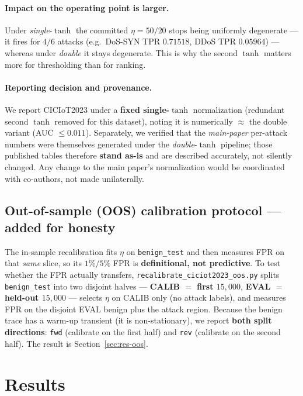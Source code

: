 \documentclass[11pt]{article}
\begin{document}
\paragraph{Impact on the operating point is larger.} Under \emph{single}-$\tanh$ the committed
$\eta=50/20$ stops being uniformly degenerate --- it fires for $4/6$ attacks (e.g.\ DoS-SYN
TPR $0.71518$, DDoS TPR $0.05964$) --- whereas under \emph{double} it stays degenerate. This is why
the second $\tanh$ matters more for thresholding than for ranking.

\paragraph{Reporting decision and provenance.} We report CICIoT2023 under a \textbf{fixed
single-$\tanh$} normalization (redundant second $\tanh$ removed for this dataset), noting it is
numerically $\approx$ the double variant (AUC $\le 0.011$). Separately, we verified that the
\emph{main-paper} per-attack numbers were themselves generated under the \emph{double}-$\tanh$
pipeline; those published tables therefore \textbf{stand as-is} and are described accurately, not
silently changed. Any change to the main paper's normalization would be coordinated with co-authors,
not made unilaterally.

\subsection{Out-of-sample (OOS) calibration protocol --- added for honesty}
\label{sec:oos}

The in-sample recalibration fits $\eta$ on \texttt{benign\_test} and then measures FPR on that
\emph{same} slice, so its $1\%/5\%$ FPR is \textbf{definitional, not predictive}. To test whether the
FPR actually transfers, \texttt{recalibrate\_ciciot2023\_oos.py} splits \texttt{benign\_test} into two
disjoint halves --- \textbf{CALIB $=$ first $15{,}000$}, \textbf{EVAL $=$ held-out $15{,}000$} ---
selects $\eta$ on CALIB only (no attack labels), and measures FPR on the disjoint EVAL benign plus the
attack region. Because the benign trace has a warm-up transient (it is non-stationary), we report
\textbf{both split directions}: \texttt{fwd} (calibrate on the first half) and \texttt{rev}
(calibrate on the second half). The result is Section~\ref{sec:res-oos}.

\section{Results}
\label{sec:results}
\end{document}
